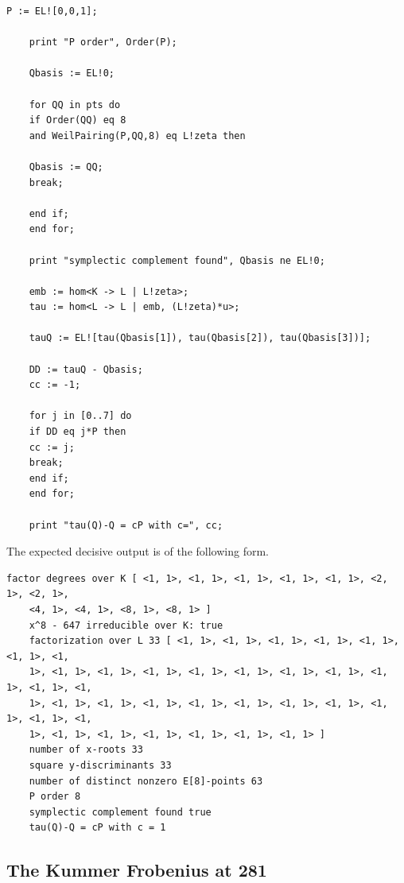 \documentclass[11pt,a4paper]{amsart}
\theoremstyle{definition}
\numberwithin{equation}{section}
\begin{document}
\begin{lstlisting}[style=magma]
	P := EL![0,0,1];
	
	print "P order", Order(P);
	
	Qbasis := EL!0;
	
	for QQ in pts do
	if Order(QQ) eq 8
	and WeilPairing(P,QQ,8) eq L!zeta then
	
	Qbasis := QQ;
	break;
	
	end if;
	end for;
	
	print "symplectic complement found", Qbasis ne EL!0;
	
	emb := hom<K -> L | L!zeta>;
	tau := hom<L -> L | emb, (L!zeta)*u>;
	
	tauQ := EL![tau(Qbasis[1]), tau(Qbasis[2]), tau(Qbasis[3])];
	
	DD := tauQ - Qbasis;
	cc := -1;
	
	for j in [0..7] do
	if DD eq j*P then
	cc := j;
	break;
	end if;
	end for;
	
	print "tau(Q)-Q = cP with c=", cc;
\end{lstlisting}

The expected decisive output is of the following form.

\begin{lstlisting}[style=magma]
	factor degrees over K [ <1, 1>, <1, 1>, <1, 1>, <1, 1>, <1, 1>, <2, 1>, <2, 1>,
	<4, 1>, <4, 1>, <8, 1>, <8, 1> ]
	x^8 - 647 irreducible over K: true
	factorization over L 33 [ <1, 1>, <1, 1>, <1, 1>, <1, 1>, <1, 1>, <1, 1>, <1,
	1>, <1, 1>, <1, 1>, <1, 1>, <1, 1>, <1, 1>, <1, 1>, <1, 1>, <1, 1>, <1, 1>, <1,
	1>, <1, 1>, <1, 1>, <1, 1>, <1, 1>, <1, 1>, <1, 1>, <1, 1>, <1, 1>, <1, 1>, <1,
	1>, <1, 1>, <1, 1>, <1, 1>, <1, 1>, <1, 1>, <1, 1> ]
	number of x-roots 33
	square y-discriminants 33
	number of distinct nonzero E[8]-points 63
	P order 8
	symplectic complement found true
	tau(Q)-Q = cP with c = 1
\end{lstlisting}

\subsection{The Kummer Frobenius at 281}\label{magma2}
\end{document}

